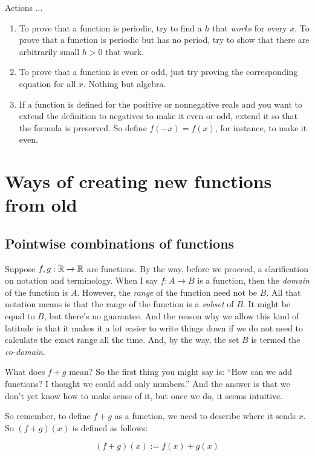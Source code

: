 \documentclass{amsart}
\begin{document}
Actions ...

\begin{enumerate}
\item To prove that a function is periodic, try to find a $h$ that
  {\em works} for every $x$. To prove that a function is periodic but
  has no period, try to show that there are arbitrarily small $h > 0$
  that work.
\item To prove that a function is even or odd, just try proving the
  corresponding equation for all $x$. Nothing but algebra.
\item If a function is defined for the positive or nonnegative reals
  and you want to extend the definition to negatives to make it even
  or odd, extend it so that the formula is preserved. So define $f(-x)
  = f(x)$, for instance, to make it even.
\end{enumerate}

\section{Ways of creating new functions from old}\label{newfunctionsfromold}

\subsection{Pointwise combinations of functions}

Suppose $f,g: \mathbb{R} \to \mathbb{R}$ are functions. By the way, before we proceed,
a clarification on notation and terminology. When I say $f:A \to B$ is
a function, then the {\em domain} of the function is $A$. However, the
{\em range} of the function need not be $B$. All that notation means
is that the range of the function is a {\em subset} of $B$. It might
be equal to $B$, but there's no guarantee. And the reason why we allow
this kind of latitude is that it makes it a lot easier to write things
down if we do not need to calculate the exact range all the time. And,
by the way, the set $B$ is termed the {\em co-domain}.

What does $f + g$ mean? So the first thing you might say is: ``How can
we add functions? I thought we could add only numbers.'' And the
answer is that we don't yet know how to make sense of it, but once we
do, it seems intuitive.

So remember, to define $f + g$ as a function, we need to describe
where it sends $x$. So $(f + g)(x)$ is defined as follows:

\begin{equation*}
  (f + g)(x) := f(x) + g(x)
\end{equation*}
\end{document}
